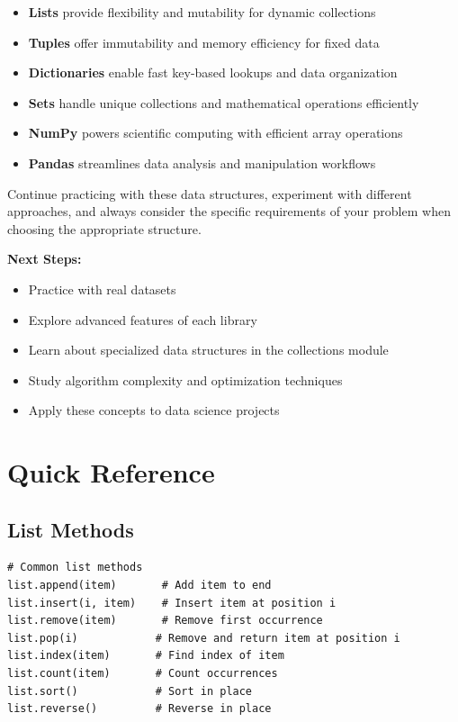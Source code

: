 \documentclass[12pt,a4paper]{book}
\begin{document}
\begin{itemize}
    \item \textbf{Lists} provide flexibility and mutability for dynamic collections
    \item \textbf{Tuples} offer immutability and memory efficiency for fixed data
    \item \textbf{Dictionaries} enable fast key-based lookups and data organization
    \item \textbf{Sets} handle unique collections and mathematical operations efficiently
    \item \textbf{NumPy} powers scientific computing with efficient array operations
    \item \textbf{Pandas} streamlines data analysis and manipulation workflows
\end{itemize}

Continue practicing with these data structures, experiment with different approaches, and always consider the specific requirements of your problem when choosing the appropriate structure.

\textbf{Next Steps:}
\begin{itemize}
    \item Practice with real datasets
    \item Explore advanced features of each library
    \item Learn about specialized data structures in the collections module
    \item Study algorithm complexity and optimization techniques
    \item Apply these concepts to data science projects
\end{itemize}

\appendix

\chapter{Quick Reference}

\section{List Methods}
\begin{lstlisting}
# Common list methods
list.append(item)       # Add item to end
list.insert(i, item)    # Insert item at position i
list.remove(item)       # Remove first occurrence
list.pop(i)            # Remove and return item at position i
list.index(item)       # Find index of item
list.count(item)       # Count occurrences
list.sort()            # Sort in place
list.reverse()         # Reverse in place
\end{lstlisting}
\end{document}
